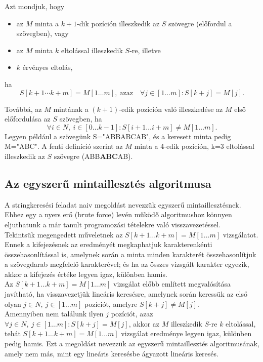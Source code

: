 \documentclass[margin=0px]{article}
\begin{document}
    \noindent Azt mondjuk, hogy
    \begin{itemize}
        \item az $M$ minta a $k+1$-dik pozíción illeszkedik az $S$ szövegre (előfordul a szövegben), vagy
        \item az $M$ minta $k$ eltolással illeszkedik $S$-re, illetve
        \item $k$ érvényes eltolás,
    \end{itemize}
    ha
    \[
        S[k+1 \cdots k+m]=M[1 \ldots m],\ \text{azaz}\quad \forall j \in [1 \ldots m] : S[k + j] = M [j].
    \]

    \noindent Továbbá, az $M$ mintának a $(k+1)$-edik pozíción való illeszkedése az $M$ első előfordulása az $S$ szövegben, ha
    \[
    \forall i \in N,\ i \in [0 \ldots k - 1] : S[i + 1 \ldots i + m] \neq M[1 \ldots m].
    \]
    \noindent Legyen például a szövegünk S="ABBABCAB", és a keresett minta pedig M="ABC". A fenti definíció szerint az $M$ minta a 4-edik pozíción, k=3 eltolással illeszkedik az $S$ szövegre (ABB\textbf{ABC}AB).

    \subsection*{Az egyszerű mintaillesztés algoritmusa}

    \noindent A stringkeresési feladat naiv megoldást nevezzük egyszerű mintaillesztésnek. Ehhez egy a nyers erő (brute force) levén működő algoritmushoz könnyen eljuthatunk a már tanult programozási tételekre való visszavezetéssel.\\

    \noindent Tekintsük megengedett műveletnek az $S[k+1 \ldots k+m] = M[1 \ldots m]$ vizsgálatot. Ennek a kifejezésnek az eredményét megkaphatjuk karakterenkénti összehasonlítással is, amelynek során a minta minden karakterét összehasonlítjuk a szövegdarab megfelelő karakterével; és ha az összes vizsgált karakter egyezik, akkor a kifejezés értéke legyen igaz, különben hamis.\\

    \noindent Az $S[k+1 \ldots k+m] = M[1 \ldots m]$ vizsgálat előbb említett megvalósítása javítható, ha visszavezetjük lineáris keresésre, amelynek során keressük az első olyan $j \in N,\ j\in[1 \ldots m]$ pozíciót, amelyre $S[k + j] \neq M[j]$.\\

    \noindent Amennyiben nem találunk ilyen $j$ pozíciót, azaz $\forall j \in N, \ j \in [1 \ldots m] : S[k + j] = M[j]$, akkor az $M$ illeszkedik $S$-re $k$ eltolással, tehát $S[k+1 \ldots k+m] = M[1 \ldots m]$ vizsgálat eredménye legyen igaz, különben pedig hamis. Ezt a megoldást nevezzük az egyszerű mintaillesztés algoritmusának, amely nem más, mint egy lineáris keresésbe ágyazott lineáris keresés.
\end{document}
